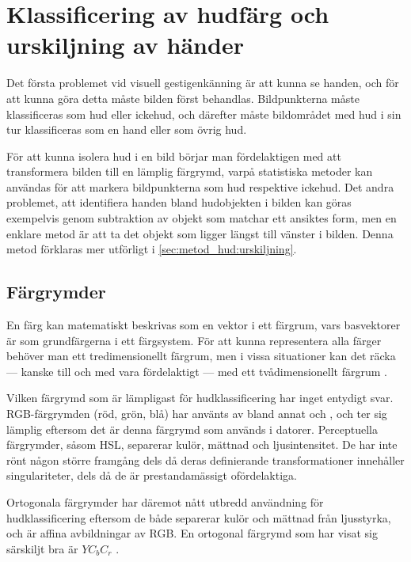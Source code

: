\documentclass[../rapport_MVEX01-11-05]{subfiles}
\begin{document}
\section{Klassificering av hudfärg och urskiljning av händer}\label{sec:hudklassificering}
Det första problemet vid visuell gestigenkänning är att kunna se handen,
och för att kunna göra detta
måste bilden först behandlas. Bildpunkterna måste klassificeras som hud 
eller ickehud, och därefter måste bildområdet med hud i sin tur 
klassificeras som en hand eller som övrig hud.

För att kunna isolera hud i en bild börjar man fördelaktigen med
att transformera bilden till en
lämplig färgrymd, varpå statistiska metoder kan användas för att
markera bildpunkterna som hud respektive ickehud.
Det andra problemet, att identifiera handen bland hudobjekten i bilden kan göras
exempelvis genom subtraktion av objekt som matchar ett ansiktes form, men en enklare
metod är att ta det objekt som ligger längst till vänster i bilden. Denna metod
förklaras mer utförligt i \ref{sec:metod_hud:urskiljning}.

\subsection{Färgrymder}\label{sec:klassificering:fargrymder}
En färg kan matematiskt beskrivas som en vektor i ett färgrum, vars
basvektorer är som grundfärgerna i ett färgsystem.
För att kunna representera alla färger
behöver man ett tredimensionellt färgrum, men i vissa situationer kan
det räcka --- kanske till och med vara fördelaktigt --- med ett
tvådimensionellt färgrum \cite{Kakumanu07}.

Vilken färgrymd som är lämpligast för hudklassificering har inget
entydigt svar.
RGB-färgrymden (röd, grön, blå) har använts av bland annat
 och , och ter sig lämplig
eftersom det är denna färgrymd som används i datorer. Perceptuella
färgrymder, såsom HSL, separerar kulör, mättnad och ljusintensitet.
De har inte rönt någon större framgång dels då deras definierande
transformationer innehåller singulariteter, dels då de är
prestandamässigt ofördelaktiga.

Ortogonala färgrymder har däremot nått utbredd användning för
hudklassificering \cite{Hsu02,Elmezain08,Hassanpour08} eftersom de
både separerar kulör och mättnad från ljusstyrka, och är affina avbildningar av
RGB. 
En ortogonal färgrymd som har visat sig särskiljt bra är $YC_bC_r$ \cite{Kakumanu07}.
\end{document}
